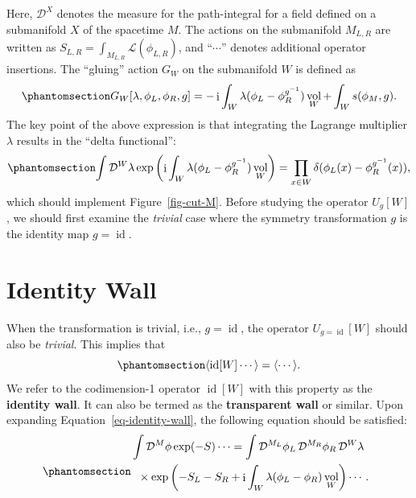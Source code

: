 \documentclass[
  letterpaper,
  DIV=11,
  numbers=noendperiod]{scrreport}
\DeclareMathOperator{\vol}{vol}
\DeclareMathOperator{\imunit}{i}
\DeclareMathOperator{\id}{id}
\begin{document}
Here, \(\mathcal{D}^{X}\) denotes the measure for the path-integral for
a field defined on a submanifold \(X\) of the spacetime \(M\). The
actions on the submanifold \(M_{L,R}\) are written as
\(S_{L,R} = \int_{M_{L,R}}\mathcal{L}(\phi_{L,R})\), and ``\(\cdots\)''
denotes additional operator insertions. The ``gluing'' action \(G_W\) on
the submanifold \(W\) is defined as
\begin{equation}\phantomsection\label{eq-gluing-action}{
    G_W[\lambda,\phi_L,\phi_R,g] = - \imunit \int_W \lambda(\phi_L - \phi_R^{g^{-1}})\vol_W+\int_W s(\phi_M,g).
}\end{equation} The key point of the above expression is that
integrating the Lagrange multiplier \(\lambda\) results in the ``delta
functional'':
\begin{equation}\phantomsection\label{eq-delta-functional}{
    \int \mathop{\mathcal{D}^W\lambda} \exp\left(\imunit \int_W \lambda (\phi_L-\phi^{g^{-1}}_R)\vol_W\right)
     = \prod_{x\in W}\delta(\phi_L(x) - \phi_R^{g^{-1}}(x)),
}\end{equation} which should implement Figure~\ref{fig-cut-M}. Before
studying the operator \(U_g[W]\), we should first examine the
\emph{trivial} case where the symmetry transformation \(g\) is the
identity map \(g=\id\).

\section{Identity Wall}\label{sec-trivial-scalar}

When the transformation is trivial, i.e., \(g=\id\), the operator
\(U_{g=\id}[W]\) should also be \emph{trivial}. This implies that
\begin{equation}\phantomsection\label{eq-identity-wall}{
\langle \id[W] \cdots \rangle = \langle \cdots \rangle.
}\end{equation} We refer to the codimension-1 operator \(\id[W]\) with
this property as the \textbf{identity wall}. It can also be termed as
the \textbf{transparent wall} or similar. Upon expanding
Equation~\ref{eq-identity-wall}, the following equation should be
satisfied: \begin{equation}\phantomsection\label{eq-trivial-scalar}{
\begin{multlined}
    \int \mathop{\mathcal{D}^M\phi} \exp(-S) \cdots=
    \int \mathop{\mathcal{D}^{M_L}\phi_L} \mathop{\mathcal{D}^{M_R}\phi_R} \mathop{\mathcal{D}^W\lambda} \\ \times \exp\left(-S_L-S_R+\imunit \int_W \lambda(\phi_L - \phi_R)\vol_W\right)\cdots.\\ 
\end{multlined}
}\end{equation}
\end{document}
